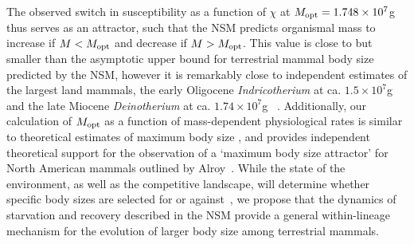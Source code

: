 \documentclass{pnastwo}
\begin{document}
\begin{article}
The observed switch in susceptibility as a function of $\chi$ at $M_{\rm opt}= 1.748\times10^7$g thus serves as an attractor, such that the NSM predicts organismal mass to increase if $M<M_{\rm opt}$ and decrease if $M>M_{\rm opt}$.
This value is close to but smaller than the asymptotic upper bound for terrestrial mammal body size predicted by the NSM, however it is remarkably close to independent estimates of the largest land mammals, the early Oligocene \emph{Indricotherium} at ca. $1.5\times10^7$g and the late Miocene \emph{Deinotherium} at ca. $1.74\times10^7$g ~\cite{Smith:2010p3442}.
Additionally, our calculation of $M_{\rm opt}$ as a function of mass-dependent physiological rates is similar to theoretical estimates of maximum body size \cite{Clauset:2009fh}, and provides independent theoretical support for the observation of a `maximum body size attractor' for North American mammals outlined by Alroy~\cite{Alroy:1998p1594}.
While the state of the environment, as well as the competitive landscape, will determine whether specific body sizes are selected for or against~\cite{Saarinen:2014br}, we propose that the dynamics of starvation and recovery described in the NSM provide a general within-lineage mechanism for the evolution of larger body size among terrestrial mammals.






\end{article}
\end{document}
